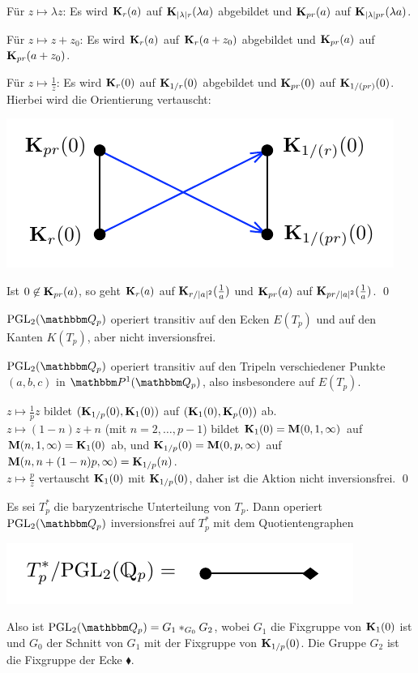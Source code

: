 \documentclass[a4paper, 12pt, twoside]{article}
\begin{document}
\begin{itemize}
Für $z\mapsto \lambda z$: Es wird $\mathbf{K}_r(a)$ auf
$\mathbf{K}_{|\lambda|r}(\lambda a)$ abgebildet und $\mathbf{K}_{pr}(a)$ auf
$\mathbf{K}_{|\lambda|pr}(\lambda a)$.

Für $z\mapsto z+z_0$: Es wird $\mathbf{K}_r(a)$ auf $\mathbf{K}_r(a+z_0)$
abgebildet und $\mathbf{K}_{pr}(a)$ auf $\mathbf{K}_{pr}(a+z_0)$.

Für $z\mapsto\frac{1}{z}$: Es wird $\mathbf{K}_r(0)$ auf
$\mathbf{K}_{1/r}(0)$ abgebildet und $\mathbf{K}_{pr}(0)$ auf
$\mathbf{K}_{1/(pr)}(0)$. Hierbei wird die Orientierung vertauscht:
\begin{center}
	\includegraphics{grugraImages/vertauscht}
\end{center}
Ist $0\not\in \mathbf{K}_{pr}(a)$, so geht $\mathbf{K}_{r}(a)$ auf
$\mathbf{K}_{r/|a|^2}(\frac{1}{a})$ und $\mathbf{K}_{pr}(a)$ auf
$\mathbf{K}_{pr/|a|^2}(\frac{1}{a})$.
\qed
\end{itemize}

\BEM $\PGL_2(\QQ_p)$ operiert transitiv auf den Ecken $E(T_p)$
und auf den Kanten $K(T_p)$, aber nicht inversionsfrei.

\bew $\PGL_2(\QQ_p)$ operiert transitiv auf den Tripeln verschiedener
Punkte $(a,b,c)$ in $\PP^1(\QQ_p)$, also insbesondere auf $E(T_p)$.

$z\mapsto \frac{1}{p}z$ bildet $(\mathbf{K}_{1/p}(0),\mathbf{K}_1(0))$ auf
$(\mathbf{K}_1(0),\mathbf{K}_p(0))$ ab.\\
$z\mapsto (1-n)z+n$ (mit $n=2,\ldots,p-1$) bildet
$\mathbf{K}_1(0)=\mathbf{M}(0,1,\infty)$ auf $\mathbf{M}(n,1,\infty)=\mathbf{K}_1(0)$ ab,
und $\mathbf{K}_{1/p}(0)=\mathbf{M}(0,p,\infty)$ auf $\mathbf{M}(n,n+(1-n)p,\infty)
=\mathbf{K}_{1/p}(n)$.\\
$z\mapsto \frac{p}{z}$ vertauscht $\mathbf{K}_1(0)$ mit $\mathbf{K}_{1/p}(0)$,
daher ist die Aktion nicht inversionsfrei.
\qed

\FOLG Es sei $T_p^*$ die baryzentrische Unterteilung von $T_p$.
Dann operiert $\PGL_2(\QQ_p)$ inversionsfrei auf $T_p^*$ mit dem
Quotientengraphen
\begin{center}
	\includegraphics{grugraImages/pglQuotient}
\end{center}
Also ist $\PGL_2(\QQ_p) = G_1 *_{G_0} G_2$, wobei $G_1$ die Fixgruppe
von $\mathbf{K}_1(0)$ ist und $G_0$ der Schnitt von $G_1$ mit
der Fixgruppe
von $\mathbf{K}_{1/p}(0)$. Die Gruppe $G_2$ ist die Fixgruppe der Ecke
$\blacklozenge$.
\end{document}
